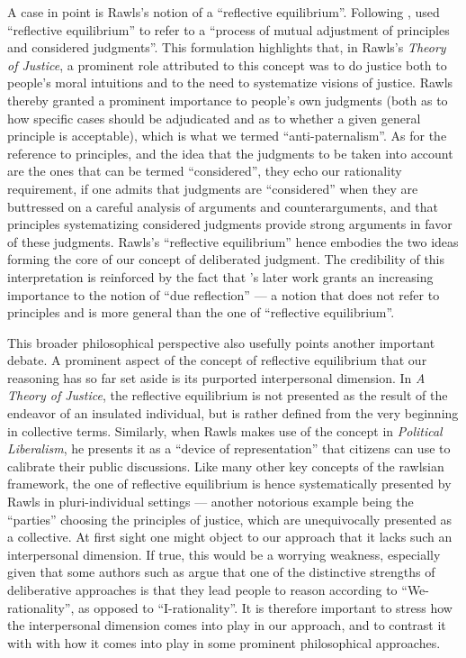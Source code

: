 \documentclass[version=3.21, pagesize, twoside=off, bibliography=totoc, DIV=calc, fontsize=12pt, a4paper, french, english]{scrartcl}
\begin{document}
A case in point is Rawls’s notion of a “reflective equilibrium”. 
Following \citet{goodman_fact_1983}, \citet[][p.18]{rawls_theory_1999} used “reflective equilibrium” to refer to a “process of mutual adjustment of principles and considered judgments”. 
This formulation highlights that, in Rawls's \emph{Theory of Justice}, a prominent role attributed to this concept was to do justice both to people's moral intuitions and to the need to systematize visions of justice. 
Rawls thereby granted a prominent importance to people's own judgments (both as to how specific cases should be adjudicated and as to whether a given general principle is acceptable), which is what we termed  “anti-paternalism”. 
As for the reference to principles, and the idea that the judgments to be taken into account are the ones that can be termed “considered”, they echo our rationality requirement, if one admits that judgments are  “considered” when they are buttressed on a careful analysis of arguments and counterarguments, and that principles systematizing considered judgments provide strong arguments in favor of these judgments. 
Rawls's “reflective equilibrium” hence embodies the two ideas forming the core of our concept of deliberated judgment. 
The credibility of this interpretation is reinforced by the fact that \citeauthor{rawls_political_2005}’s \citeyearpar{rawls_political_2005} later work grants an increasing importance to the notion of “due reflection” --- a notion that does not refer to principles and is more general than the one of “reflective equilibrium”. 

This broader philosophical perspective also usefully points another important debate. 
A prominent aspect of the concept of reflective equilibrium that our reasoning has so far set aside is its purported interpersonal dimension. 
In \emph{A Theory of Justice}, the reflective equilibrium is not presented as the result of the endeavor of an insulated individual, but is rather defined from the very beginning in collective terms. 
Similarly, when Rawls makes use of the concept in \emph{Political Liberalism}, he presents it as a  “device of representation” that citizens can use to calibrate their public discussions. 
Like many other key concepts of the rawlsian framework, the one of reflective equilibrium is hence systematically presented by Rawls in pluri-individual settings --- another notorious example being the “parties” choosing the principles of justice, which are unequivocally presented as a collective. 
At first sight one might object to our approach that it lacks such an interpersonal dimension.
If true, this would be a worrying weakness, especially given that some authors such as \citet{vatn_institutional_2009} argue that one of the distinctive strengths of deliberative approaches is that they lead people to reason according to ``We-rationality'', as opposed to ``I-rationality''. 
It is therefore important to stress how the interpersonal dimension comes into play in our approach, and to contrast it with with how it comes into play in some prominent philosophical approaches.
\end{document}
